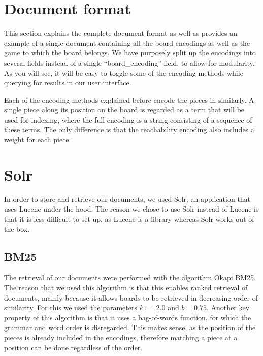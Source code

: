 \documentclass[11pt]{article}
\begin{document}


    \section{Document format}\label{sec:documentformat}


    This section explains the complete document format as well as provides an example of a single document containing all the board encodings as well as the game to which the board belongs. We have purposely split up the encodings into several fields instead of a single ``board\_encoding'' field, to allow for modularity. As you will see, it will be easy to toggle some of the encoding methods while querying for results in our user interface.

    Each of the encoding methods explained before encode the pieces in similarly. A single piece along its position on the board is regarded as a term that will be used for indexing, where the full encoding is a string consisting of a sequence of these terms. The only difference is that the reachability encoding also includes a weight for each piece.


    \section{Solr}

    In order to store and retrieve our documents, we used Solr, an application that uses Lucene under the hood. The reason we chose to use Solr instead of Lucene is that it is less difficult to set up, as Lucene is a library whereas Solr works out of the box.

    \subsection{BM25}

    The retrieval of our documents were performed with the algorithm Okapi BM25. The reason that we used this algorithm is that this enables ranked retrieval of documents, mainly because it allows boards to be retrieved in decreasing order of similarity. For this we used the parameters $k1 = 2.0$ and $b = 0.75$. Another key property of this algorithm is that it uses a bag-of-words function, for which the grammar and word order is disregarded. This makes sense, as the position of the pieces is already included in the encodings, therefore matching a piece at a position can be done regardless of the order.
\end{document}
